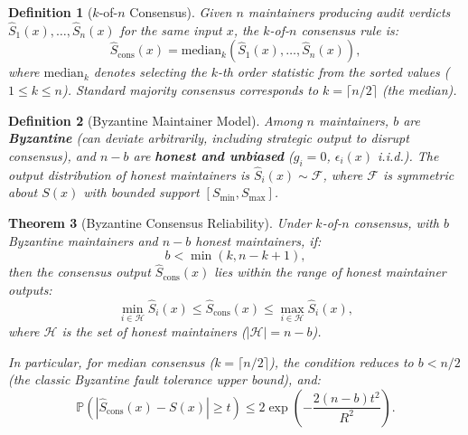 \documentclass[11pt,a4paper]{article}
\newtheorem{theorem}{Theorem}[section]
\newtheorem{definition}[theorem]{Definition}
\theoremstyle{definition}
\newcommand{\Prob}{\mathbb{P}}
\begin{document}
\begin{definition}[$k$-of-$n$ Consensus]
\label{def:k_of_n}
Given $n$ maintainers producing audit verdicts $\hat{S}_1(x), \ldots, \hat{S}_n(x)$ for the same input $x$, the $k$-of-$n$ consensus rule is:
\begin{equation}\label{eq:k_of_n_rule}
    \hat{S}_{\text{cons}}(x) = \text{median}_{k}(\hat{S}_1(x), \ldots, \hat{S}_n(x)),
\end{equation}
where $\text{median}_{k}$ denotes selecting the $k$-th order statistic from the sorted values ($1 \leq k \leq n$). Standard majority consensus corresponds to $k = \lceil n/2 \rceil$ (the median).
\end{definition}

\begin{definition}[Byzantine Maintainer Model]
\label{def:byzantine}
Among $n$ maintainers, $b$ are \textbf{Byzantine} (can deviate arbitrarily, including strategic output to disrupt consensus), and $n-b$ are \textbf{honest and unbiased} ($g_i = 0$, $\epsilon_i(x)$ i.i.d.). The output distribution of honest maintainers is $\hat{S}_i(x) \sim \mathcal{F}$, where $\mathcal{F}$ is symmetric about $S(x)$ with bounded support $[S_{\min}, S_{\max}]$.
\end{definition}

\begin{theorem}[Byzantine Consensus Reliability]
\label{thm:byzantine_consensus}
Under $k$-of-$n$ consensus, with $b$ Byzantine maintainers and $n-b$ honest maintainers, if:
\begin{equation}\label{eq:byzantine_condition}
    b < \min(k, n-k+1),
\end{equation}
then the consensus output $\hat{S}_{\text{cons}}(x)$ lies within the range of honest maintainer outputs:
\begin{equation}\label{eq:byzantine_consensus_bound}
    \min_{i \in \mathcal{H}} \hat{S}_i(x) \leq \hat{S}_{\text{cons}}(x) \leq \max_{i \in \mathcal{H}} \hat{S}_i(x),
\end{equation}
where $\mathcal{H}$ is the set of honest maintainers ($|\mathcal{H}| = n-b$).

In particular, for median consensus ($k = \lceil n/2 \rceil$), the condition reduces to $b < n/2$ (the classic Byzantine fault tolerance upper bound), and:
\begin{equation}\label{eq:median_bound}
    \Prob\left(|\hat{S}_{\text{cons}}(x) - S(x)| \geq t\right) \leq 2\exp\left(-\frac{2(n-b) t^2}{R^2}\right).
\end{equation}
\end{theorem}
\end{document}
